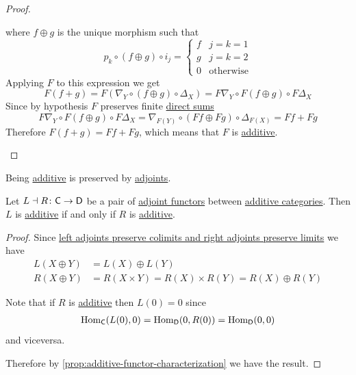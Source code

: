 \documentclass[../../main]{subfiles}
\begin{document}
\begin{proof}
\begin{itemize}
          where \(f \oplus g\) is the unique morphism such that
          \begin{equation*}
            p_{k} \circ (f \oplus g) \circ i_{j} = \begin{cases}
              f & j = k = 1 \\
              g & j = k = 2 \\
              0 & \text{otherwise}
            \end{cases}
          \end{equation*}
          Applying \(F\) to this expression we get
          \begin{equation*}
            F(f + g) = F(\nabla_{Y} \circ (f \oplus g) \circ \Delta_{X}) = F\nabla_{Y} \circ F(f \oplus g) \circ F\Delta_{X}
          \end{equation*}
          Since by hypothesis \(F\) preserves finite \hyperref[def:direct-sum]{direct sums}
          \begin{equation*}
            F\nabla_{Y} \circ F(f \oplus g) \circ F\Delta_{X} = \nabla_{F(Y)} \circ (Ff \oplus Fg) \circ \Delta_{F(X)} = Ff + Fg
          \end{equation*}
          Therefore \(F(f + g) = Ff + Fg\), which means that \(F\) is \hyperref[def:additive-functor]{additive}. \qedhere
  \end{itemize}
\end{proof}

Being \hyperref[def:additive-functor]{additive} is preserved by \hyperref[def:adjoint-functors]{adjoints}.
\begin{proposition}\label{prop:additive-functors-and-adjunctions}
  Let \(L \dashv R\colon \mathsf{C} \to \mathsf{D}\) be a pair of \hyperref[def:adjoint-functors]{adjoint functors} between \hyperref[def:additive-category]{additive categories}.
  Then \(L\) is \hyperref[def:additive-functor]{additive} if and only if \(R\) is \hyperref[def:additive-functor]{additive}.
\end{proposition}
\begin{proof}
  Since \hyperref[thm:adjoints-preserve-limits]{left adjoints preserve colimits and right adjoints preserve limits} we have
  \begin{align*}
    L(X \oplus Y) &= L(X) \oplus L(Y) \\
    R(X \oplus Y) &= R(X \times Y) = R(X) \times R(Y) = R(X) \oplus R(Y)
  \end{align*}

  Note that if \(R\) is \hyperref[def:additive-functor]{additive} then \(L(0) = 0\) since
  \begin{align*}
    \operatorname{Hom}_{\mathsf{C}}(L(0), 0) = \operatorname{Hom}_{\mathsf{D}}(0, R(0)) = \operatorname{Hom}_{\mathsf{D}}(0, 0)
  \end{align*}
  and viceversa.
  
  Therefore by \autoref{prop:additive-functor-characterization} we have the result.
\end{proof}
\end{document}
